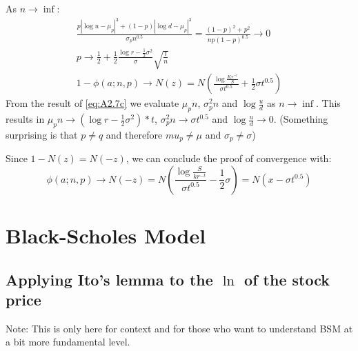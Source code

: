 \documentclass{article}
\begin{document}
As $n \rightarrow \inf$:\begin{gather}
    \frac{p |\log u - \mu_p|^3 + (1 - p)|\log d - \mu_p|^3}{\sigma_p n^{0.5}} = \frac{(1 - p)^2 + p^2}{n p (1 - p)^{0.5}} \rightarrow 0\label{eq:A2.7a}\\
    p \rightarrow \frac{1}{2} + \frac{1}{2}\frac{\log r - \frac{1}{2}\sigma^2}{\sigma}\sqrt{\frac{t}{n}}\label{eq:A2.7b}\\
    1 - \phi(a; n, p) \rightarrow N(z) = N\left(\frac{\log{\frac{K r^{-t}}{S}}}{\sigma t^{0.5}} + \frac{1}{2} \sigma t^{0.5}\right)\label{eq:A2.7c}
\end{gather}
From the result of \ref{eq:A2.7c} we evaluate $\mu_p n$, $\sigma_p^2n$ and $\log{\frac{u}{d}}$ as $n \rightarrow \inf$. This results in $\mu_p n \rightarrow (\log r - \frac{1}{2}\sigma^2) * t$, $\sigma_p^2n \rightarrow \sigma t^{0.5}$ and $\log{\frac{u}{d}} \rightarrow 0$. (Something surprising is that $p \not= q$ and therefore $mu_p \not= \mu$ and $\sigma_p \not= \sigma$)

Since $1 - N(z) = N(-z)$, we can conclude the proof of convergence with:
\begin{equation}\label{eq:A2.8}
    \phi(a; n, p) \rightarrow N(-z) = N\left(\frac{\log{\frac{S}{k r^{-t}}}}{\sigma t^{0.5}} - \frac{1}{2} \sigma\right) = N(x - \sigma t^{0.5})
\end{equation}

\section{Black-Scholes Model}

\subsection{Applying Ito's lemma to the $\ln$ of the stock price}
Note: This is only here for context and for those who want to understand BSM at a bit more fundamental level.\newline
\end{document}
